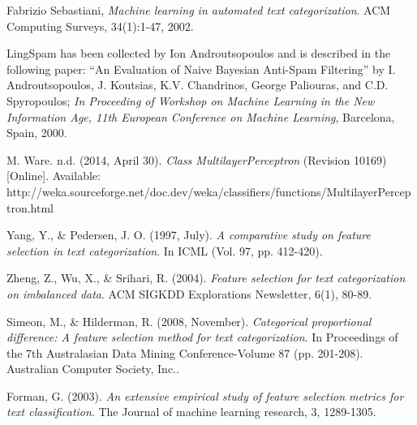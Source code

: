 \documentclass[10pt, a4paper]{article}
\begin{document}
\begin{thebibliography}{9}

  Fabrizio Sebastiani, \emph{Machine learning in automated text categorization}. ACM Computing Surveys, 34(1):1-47, 2002.

LingSpam has been collected by Ion Androutsopoulos and is described in the following paper: ``An Evaluation of Naive Bayesian Anti-Spam Filtering'' by I. Androutsopoulos, J. Koutsias, K.V. Chandrinos, George Paliouras, and C.D. Spyropoulos; \textit{In Proceeding of Workshop on Machine Learning in the New Information Age, 11th European Conference on Machine Learning}, Barcelona, Spain, 2000.

M. Ware. n.d. (2014, April 30). \emph{Class MultilayerPerceptron} (Revision 10169) [Online]. Available: http://weka.sourceforge.net/doc.dev/weka/classifiers/functions/MultilayerPerceptron.html

Yang, Y., \& Pedersen, J. O. (1997, July). \emph{A comparative study on feature selection in text categorization}. In ICML (Vol. 97, pp. 412-420).

Zheng, Z., Wu, X., \& Srihari, R. (2004). \emph{Feature selection for text categorization on imbalanced data}. ACM SIGKDD Explorations Newsletter, 6(1), 80-89.

Simeon, M., \& Hilderman, R. (2008, November). \emph{Categorical proportional difference: A feature selection method for text categorization}. In Proceedings of the 7th Australasian Data Mining Conference-Volume 87 (pp. 201-208). Australian Computer Society, Inc..



Forman, G. (2003). \emph{An extensive empirical study of feature selection metrics for text classification}. The Journal of machine learning research, 3, 1289-1305.

\end{thebibliography}
\end{document}
